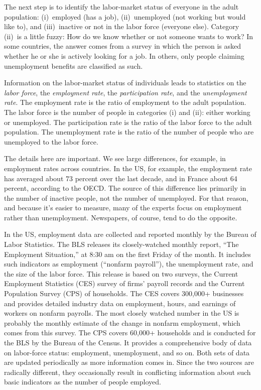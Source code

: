 The next step is to identify the labor-market status of everyone
in the adult population:
(i)~employed (has a job), (ii)~unemployed (not working but would like to),
and (iii)~inactive or not in the labor force (everyone else).
Category (ii)~is a little fuzzy:  How do we know whether or not
someone wants to work? In some countries, the answer comes from a
survey in which the person is asked whether he or she is actively looking
for a job. In others, only people claiming unemployment benefits
are classified as such.

Information on the labor-market status of individuals leads to
statistics on the {\it labor force\/},
the {\it employment rate\/},
the {\it participation rate\/},
and the {\it unemployment rate\/}.
The employment rate is the ratio of employment to the adult population.
The labor force is the number of people in categories (i) and
(ii): either working or unemployed.
The participation rate is the ratio of the labor force to the adult population.
The unemployment rate is the ratio of the number of people who are unemployed to the labor force.

The details here are important.
We see large differences, for example, in employment rates across countries.
In the US, for example,
the employment rate has averaged about 73 percent over the last decade,
and in France about 64 percent, according to the OECD.
The source of this difference lies primarily in the number of inactive
people, not the number of unemployed.
For that reason, and because it's easier to measure,
many of the experts focus on employment rather than unemployment.
Newspapers, of course, tend to do the opposite.


In the US, employment data are collected and reported monthly by
the Bureau of Labor Statistics. The BLS releases its
closely-watched monthly report, ``The Employment Situation,'' at
8:30 am on the first Friday of the month.  It includes such
indicators as employment (``nonfarm payroll''),
the unemployment rate, and the size of the labor force.
This release is based on two surveys, the Current
Employment Statistics (CES) survey of firms' payroll records and
the Current Population Survey (CPS) of households. The CES covers
300,000+ businesses and provides detailed industry data on
employment, hours, and earnings of workers on nonfarm payrolls.
The most closely watched number in the US is probably the monthly
estimate of the change in nonfarm employment, which comes from this survey.
The CPS covers 60,000+ households and is conducted for the BLS by
the Bureau of the Census. It provides a comprehensive body of data
on labor-force status:  employment, unemployment, and so on.  Both
sets of data are updated periodically as more information comes
in.  Since the two sources are radically different,
they occasionally result in conflicting information about such
basic indicators as the number of people employed.

